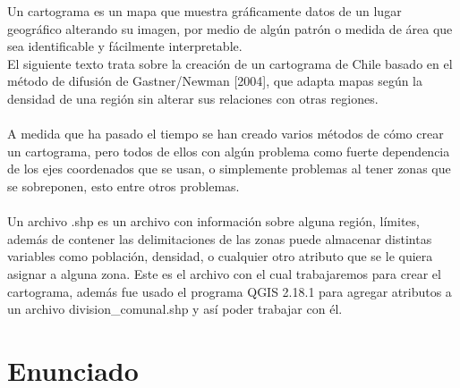 \documentclass[20pt]{report}
\begin{document}
Un cartograma es un mapa que muestra gr\'aficamente datos de un lugar geogr\'afico alterando su  imagen,  por medio de alg\'un patr\'on o medida de \'area que sea identificable  y f\'acilmente interpretable.\\
 El siguiente texto trata sobre  la creaci\'on de un cartograma de Chile basado en el m\'etodo de difusi\'on de Gastner/Newman [2004], que adapta mapas seg\'un la densidad de una regi\'on sin alterar sus relaciones  con otras regiones.
 \\
 \\
A medida que ha pasado el tiempo se han creado varios m\'etodos de c\'omo crear un cartograma,  pero todos de ellos con alg\'un problema como fuerte dependencia de los ejes coordenados que se usan, o simplemente problemas al tener zonas que se sobreponen, esto entre otros problemas.
\\
\\
    
Un archivo .shp  es un archivo con informaci\'on sobre alguna regi\'on,  l\'imites, adem\'as de contener las delimitaciones de las zonas puede almacenar  distintas variables como poblaci\'on, densidad,  o cualquier otro atributo que se le quiera asignar a alguna zona. Este es el archivo con el cual  trabajaremos para crear el cartograma, adem\'as fue usado el programa QGIS 2.18.1 para agregar atributos a un archivo division\_comunal.shp y as\'i poder trabajar con \'el. 
\pagebreak



\chapter{Enunciado }\label{cap.introduccion}
\end{document}
